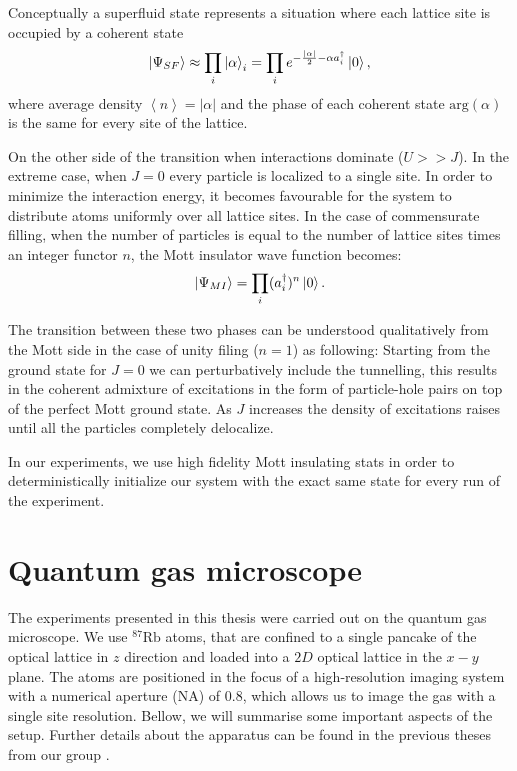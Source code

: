 Conceptually a superfluid state represents a situation where each lattice site is occupied by a coherent state
\begin{equation}
\left|\Psi_{SF}\right\rangle \approx\prod_i \left|\alpha\right\rangle_i=\prod_i e^{-\frac{\left| \alpha \right|}{2}-\alpha a^\dagger_i}\left|0\right\rangle,
\end{equation}
where average density $\left<n\right> = \left| \alpha \right|$ and the phase of each coherent state $\textrm{arg}(\alpha)$ is the same for every site of the lattice.

On the other side of the transition when interactions dominate ($U>>J$). In the extreme case, when $J=0$ every particle is localized to a single site. In order to minimize the interaction energy, it becomes favourable for the system to distribute atoms uniformly over all lattice sites. In the case of commensurate filling, when the number of particles is equal to the number of lattice sites times an integer functor $n$, the Mott insulator wave function becomes:
\begin{equation}
\left|\Psi_{MI}\right\rangle =\prod_i (a_i^\dagger)^n\left|0\right\rangle.
\end{equation}

The transition between these two phases can be understood qualitatively from the Mott side in the case of unity filing ($n=1$) as following: Starting from the ground state for $J=0$ we can perturbatively include the tunnelling, this results in the coherent admixture of excitations in the form of particle-hole pairs on top of the perfect Mott ground state. As $J$ increases the density of excitations raises until all the particles completely delocalize. 

In our experiments, we use high fidelity Mott insulating stats in order to deterministically initialize our system with the exact same state for every run of the experiment.

\section{Quantum gas microscope}
The experiments presented in this thesis were carried out on the quantum gas microscope. We use $^{87}\textrm{Rb}$ atoms, that are confined to a single pancake of the optical lattice in $z$ direction and loaded into a $2D$ optical lattice in the $x-y$ plane. The atoms are positioned in the focus of a high-resolution imaging system with a numerical aperture (NA) of $0.8$, which allows us to image the gas with a single site resolution. Bellow, we will summarise some important aspects of the setup. Further details about the apparatus can be found in the previous theses from our group \cite{peng, gillen, Backr}.


